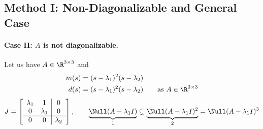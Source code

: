 \subsection{Method I: Non-Diagonalizable and General Case}\label{ss:method1-general}
%
\paragraph{Case II: $A$ is not diagonalizable.}

\begin{example}
Let us have $A\in\R^{3\times3}$ and
\begin{align*}
m(s) &= (s-\lambda_1)^2(s-\lambda_2)\\
d(s) &= (s-\lambda_1)^2(s-\lambda_2) \qquad\text{as } A\in\R^{3\times3}
\end{align*}
\[
J = \left[\begin{array}{cc|c} \lambda_1 & 1 & 0\\ 0 & \lambda_1 & 0\\ \hline 0 & 0 & \lambda_2\end{array}\right],
\qquad
\underbrace{\Null(A-\lambda_1I)}_{1} \subsetneq \underbrace{\Null(A-\lambda_1I)^2}_{2} = \Null(A-\lambda_1I)^3
\]


\end{example}
